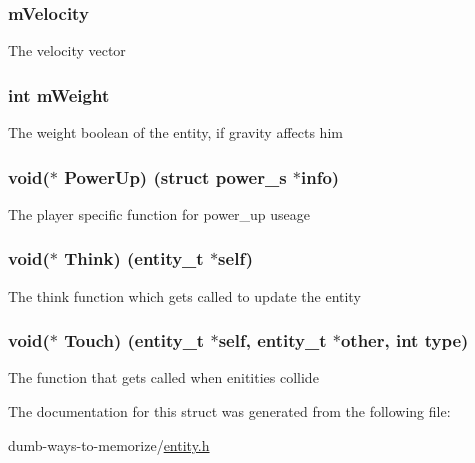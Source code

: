 \subsubsection[{\texorpdfstring{m\+Velocity}{mVelocity}}]{ m\+Velocity}\hypertarget{structentity__s_ad3ee4f856561237cfaeb8af26759aec1}{}\label{structentity__s_ad3ee4f856561237cfaeb8af26759aec1}
The velocity vector 
\subsubsection[{\texorpdfstring{m\+Weight}{mWeight}}]{\setlength{\rightskip}{0pt plus 5cm}int m\+Weight}\hypertarget{structentity__s_a069df5fe6b0f5a8eb03b0cc4c2e0ba43}{}\label{structentity__s_a069df5fe6b0f5a8eb03b0cc4c2e0ba43}
The weight boolean of the entity, if gravity affects him 
\subsubsection[{\texorpdfstring{Power\+Up}{PowerUp}}]{\setlength{\rightskip}{0pt plus 5cm}void($\ast$ Power\+Up) (struct {\bf power\+\_\+s} $\ast$info)}\hypertarget{structentity__s_ad1606f41f8e2d6ffa8da068d620a102e}{}\label{structentity__s_ad1606f41f8e2d6ffa8da068d620a102e}
The player specific function for power\+\_\+up useage 
\subsubsection[{\texorpdfstring{Think}{Think}}]{\setlength{\rightskip}{0pt plus 5cm}void($\ast$ Think) ({\bf entity\+\_\+t} $\ast$self)}\hypertarget{structentity__s_ae045b7ba608e955e791f8af8507b78a4}{}\label{structentity__s_ae045b7ba608e955e791f8af8507b78a4}
The think function which gets called to update the entity 
\subsubsection[{\texorpdfstring{Touch}{Touch}}]{\setlength{\rightskip}{0pt plus 5cm}void($\ast$ Touch) ({\bf entity\+\_\+t} $\ast$self, {\bf entity\+\_\+t} $\ast$other, int type)}\hypertarget{structentity__s_af5c032961c1c6bca1832a0cb3fb34321}{}\label{structentity__s_af5c032961c1c6bca1832a0cb3fb34321}
The function that gets called when enitities collide 

The documentation for this struct was generated from the following file\+:\begin{DoxyCompactItemize}
\item 
dumb-\/ways-\/to-\/memorize/\hyperlink{entity_8h}{entity.\+h}\end{DoxyCompactItemize}
